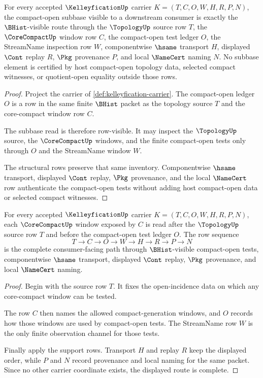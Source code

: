 \begin{theorem}
\label{thm:kelleyfication-compact-open-subbase}
For every accepted $\KelleyficationUp$ carrier $K=(T,C,O,W,H,R,P,N)$, the compact-open subbase visible to a downstream consumer is exactly the $\BHist$-visible route through the $\TopologyUp$ source row $T$, the $\CoreCompactUp$ window row $C$, the compact-open test ledger $O$, the StreamName inspection row $W$, componentwise $\hsame$ transport $H$, displayed $\Cont$ replay $R$, $\Pkg$ provenance $P$, and local $\NameCert$ naming $N$. No subbase element is certified by host compact-open topology data, selected compact witnesses, or quotient-open equality outside those rows.
\end{theorem}
\begin{proof}
Project the carrier of \autoref{def:kelleyfication-carrier}. The compact-open ledger $O$ is a row in the same finite $\BHist$ packet as the topology source $T$ and the core-compact window row $C$.

The subbase read is therefore row-visible. It may inspect the $\TopologyUp$ source, the $\CoreCompactUp$ windows, and the finite compact-open tests only through $O$ and the StreamName window $W$.

The structural rows preserve that same inventory. Componentwise $\hsame$ transport, displayed $\Cont$ replay, $\Pkg$ provenance, and the local $\NameCert$ row authenticate the compact-open tests without adding host compact-open data or selected compact witnesses.
\end{proof}

\begin{theorem}
\label{thm:kelleyfication-corecompact-window}
For every accepted $\KelleyficationUp$ carrier $K=(T,C,O,W,H,R,P,N)$, each $\CoreCompactUp$ window exposed by $C$ is read after the $\TopologyUp$ source row $T$ and before the compact-open test ledger $O$. The row sequence
$$
T \to C \to O \to W \to H \to R \to P \to N
$$
is the complete consumer-facing path through $\BHist$-visible compact-open tests, componentwise $\hsame$ transport, displayed $\Cont$ replay, $\Pkg$ provenance, and local $\NameCert$ naming.
\end{theorem}
\begin{proof}
Begin with the source row $T$. It fixes the open-incidence data on which any core-compact window can be tested.

The row $C$ then names the allowed compact-generation windows, and $O$ records how those windows are used by compact-open tests. The StreamName row $W$ is the only finite observation channel for those tests.

Finally apply the support rows. Transport $H$ and replay $R$ keep the displayed order, while $P$ and $N$ record provenance and local naming for the same packet. Since no other carrier coordinate exists, the displayed route is complete.
\end{proof}

